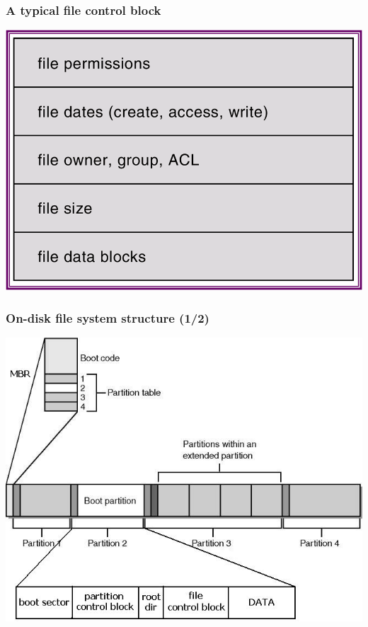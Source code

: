 \documentclass[CJKutf8,xcolor=pdftex,dvipsnames,table]{beamer}
\begin{document}
\begin{CJK*}{UTF8}{song}
  \begin{frame}
    \frametitle{A typical file control block} \pause
    \begin{center}
      \includegraphics[scale=.5]{v6f12-2}
    \end{center}
  \end{frame}
  
  \begin{frame}
    \frametitle{On-disk file system structure (1/2)} \pause
    \begin{center}
      \includegraphics[scale=.5]{disklayout}
    \end{center}
  \end{frame}
  

\end{CJK*}
\end{document}
